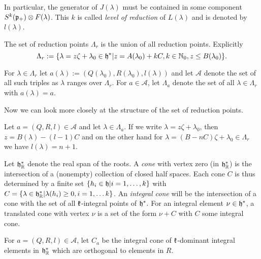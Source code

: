 In particular, the generator of $J(\lambda)$ must be contained in some component $S^k(\mathfrak{p}_+)\otimes F(\lambda)$. This $k$ is called \emph{level of reduction} of $L(\lambda)$ and is denoted by $l(\lambda)$.

\begin{definition}
 The set of reduction points $\Lambda_r$ is the union of all reduction points. Explicitly
 \[
 \Lambda_r := \{ \lambda = z\zeta + \lambda_0 \in \mathfrak{h}^* | z = A(\lambda_0) +kC, k\in\mathbb{N}_0, z \leq B(\lambda_0) \}.
 \]

 For $\lambda \in \Lambda_r$ let $a(\lambda) := (Q(\lambda_0),R(\lambda_0),l(\lambda))$ and let $\mathcal{A}$ denote the set of all such triples as $\lambda$ ranges over $\Lambda_r$. For $a\in\mathcal{A}$, let $\Lambda_a$ denote the set of all $\lambda\in\Lambda_r$ with $a(\lambda)=a$.
\end{definition}

Now we can look more closely at the structure of the set of reduction points. 

\begin{corollary}
 Let $a=(Q,R,l)\in\mathcal{A}$ and let $\lambda\in\Lambda_a$. If we write $\lambda= z\zeta + \lambda_0$, then $z=B(\lambda)-(l-1)C$ and on the other hand for $\lambda=(B - nC)\zeta + \lambda_0 \in \Lambda_r$ we have $l(\lambda) =n+1$.
\end{corollary}

Let $\mathfrak{h}^*_{\mathbb{R}}$ denote the real span of the roots. A \emph{cone} with vertex zero (in $\mathfrak{h}^*_{\mathbb{R}}$) is the intersection of a (nonempty) collection of closed half spaces. Each cone $C$ is thus determined by a finite set $\{h_i \in \mathfrak{h}|i=1,\ldots,k\}$ with $C= \{ \lambda \in \mathfrak{h}^*_{\mathbb{R}} | \lambda(h_i) \geq 0, i=1,\ldots k\}$. An \emph{integral cone} will be the intersection of a cone with the set of all $\mathfrak{k}$-integral points of $\mathfrak{h}^*.$ For an integral element $\nu\in\mathfrak{h}^*$, a translated cone with vertex $\nu$ is a set of the form $\nu + C$ with $C$ some integral cone.

\begin{definition}
 For $a=(Q,R,l)\in\mathcal{A}$, let $C_a$ be the integral cone of $\mathfrak{k}$-dominant integral elements in $\mathfrak{h}^*_{\mathbb{R}}$ which are orthogonal to elements in $R$.
\end{definition}

